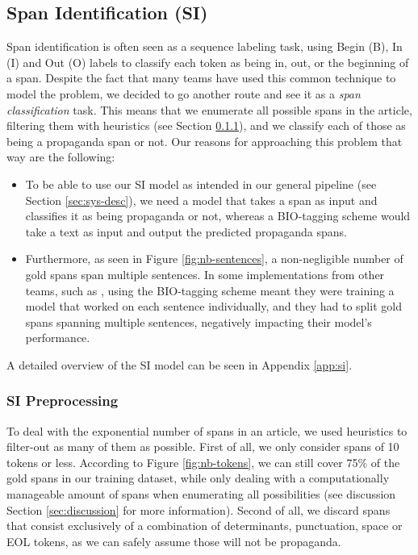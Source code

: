 \documentclass[11pt]{article}
\newcommand{\pol}[1]{{\fontfamily{pcr}\selectfont#1}}
\begin{document}
\subsection{Span Identification (\pol{SI})} \label{sec:si}
Span identification is often seen as a sequence labeling task, using Begin (\pol{B}), In (\pol{I}) and Out (\pol{O}) labels to classify each token as being in, out, or the beginning of a span. Despite the fact that many teams have used this common technique to model the problem, we decided to go another route and see it as a \textit{span classification} task. This means that we enumerate all possible spans in the article, filtering them with heuristics (see Section \ref{sec:si:preprocesing}), and we classify each of those as being a propaganda span or not. Our reasons for approaching this problem that way are the following:
\begin{itemize}
    \item To be able to use our \pol{SI} model as intended in our general pipeline (see Section \ref{sec:sys-desc}), we need a model that takes a span as input and classifies it as being propaganda or not, whereas a \pol{BIO}-tagging scheme would take a text as input and output the predicted propaganda spans.
    \item Furthermore, as seen in Figure \ref{fig:nb-sentences}, a non-negligible number of gold spans span multiple sentences. In some implementations from other teams, such as \cite{dimov2020nopropaganda}, using the \pol{BIO}-tagging scheme meant they were training a model that worked on each sentence individually, and they had to split gold spans spanning multiple sentences, negatively impacting their model's performance.
\end{itemize}

A detailed overview of the \pol{SI} model can be seen in Appendix \ref{app:si}.


\subsubsection{\pol{SI} Preprocessing}  \label{sec:si:preprocesing}
To deal with the exponential number of spans in an article, we used heuristics to filter-out as many of them as possible. First of all, we only consider spans of 10 tokens or less. According to Figure \ref{fig:nb-tokens}, we can still cover 75\% of the gold spans in our training dataset, while only dealing with a computationally manageable amount of spans when enumerating all possibilities (see discussion Section \ref{sec:discussion} for more information). Second of all, we discard spans that consist exclusively of a combination of determinants, punctuation, space or \pol{EOL} tokens, as we can safely assume those will not be propaganda.
\end{document}
